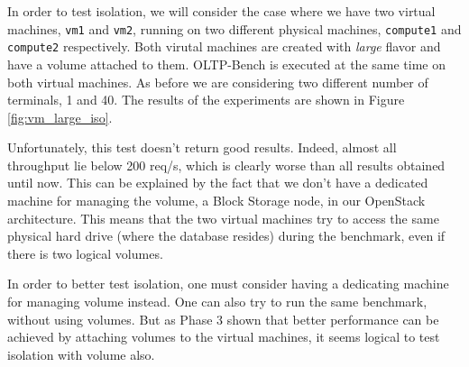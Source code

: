 In order to test isolation, we will consider the case where we have two virtual machines, \texttt{vm1} and \texttt{vm2}, running on two different physical machines, \texttt{compute1} and \texttt{compute2} respectively. 
Both virutal machines are created with \textit{large} flavor and have a volume attached to them. 
OLTP-Bench is executed at the same time on both virtual machines. 
As before we are considering two different number of terminals, 1 and 40. 
The results of the experiments are shown in Figure \ref{fig:vm_large_iso}.

Unfortunately, this test doesn't return good results.
Indeed, almost all throughput lie below 200 req/s, which is clearly worse than all results obtained until now.
This can be explained by the fact that we don't have a dedicated machine for managing the volume, a Block Storage node, in our OpenStack architecture.
This means that the two virtual machines try to access the same physical hard drive (where the database resides) during the benchmark, even if there is two logical volumes.

In order to better test isolation, one must consider having a dedicating machine for managing volume instead.
One can also try to run the same benchmark, without using volumes.
But as Phase 3 shown that better performance can be achieved by attaching volumes to the virtual machines, it seems logical to test isolation with volume also.

